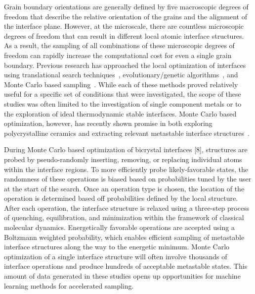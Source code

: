 \documentclass[aip,reprint,longbibliography,amsmath,amssymb,twocolumn,superscriptaddress]{revtex4-1}
\begin{document}
Grain boundary orientations are generally defined by five macroscopic degrees of freedom that describe the relative orientation of the grains and the alignment of the interface plane. 
%
However, at the microscale, there are countless microscopic degrees of freedom that can result in different local atomic interface structures. 
%
As a result, the sampling of all combinations of these microscopic degrees of freedom can rapidly increase the computational cost for even a single grain boundary. 
%
Previous research has approached the local optimization of interfaces using translational search techniques~\cite{Olmstead2009}, evolutionary/genetic algorithms~\cite{Zhu2018}, and Monte Carlo based sampling~\cite{Banadaki2018}.
%
While each of these methods proved relatively useful for a specific set of conditions that were investigated, the scope of these studies was often limited to the investigation of single component metals or to the exploration of ideal thermodynamic stable interfaces. 
%
Monte Carlo based optimization, however, has recently shown promise in both exploring polycrystalline ceramics and extracting relevant metastable interface structures~\cite{Guziewski2019}. 

During Monte Carlo based optimization of bicrystal interfaces [8], structures are probed by pseudo-randomly inserting, removing, or replacing individual atoms within the interface regions. 
%
To more efficiently probe likely-favorable states, the randomness of these operations is biased based on probabilities tuned by the user at the start of the search. 
%
Once an operation type is chosen, the location of the operation is determined based off probabilities defined by the local structure. 
%
After each operation, the interface structure is relaxed using a three-step process of quenching, equilibration, and minimization within the framework of classical molecular dynamics. 
%
Energetically favorable operations are accepted using a Boltzmann weighted probability, which enables efficient sampling of metastable interface structures along the way to the energetic minimum. 
%
Monte Carlo optimization of a single interface structure will often involve thousands of interface operations and produce hundreds of acceptable metastable states. 
%
This amount of data generated in these studies opens up opportunities for machine learning methods for accelerated sampling.  
\end{document}
